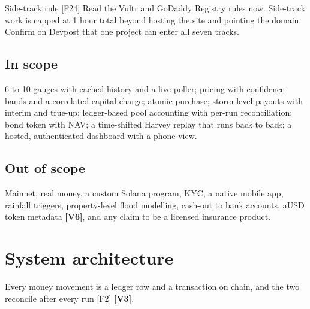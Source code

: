 \documentclass[11pt]{article}
\newcommand{\fix}[1]{\textcolor{fixgreen}{\textbf{[#1]}}}
\begin{document}
\begin{callout}[atlasorange]{Side-track rule [F24]}
Read the Vultr and GoDaddy Registry rules now. Side-track work is capped at 1 hour total beyond hosting the site and pointing the domain. Confirm on Devpost that one project can enter all seven tracks.
\end{callout}

\subsection{In scope}
6 to 10 gauges with cached history and a live poller; pricing with confidence bands and a correlated capital charge; atomic purchase; storm-level payouts with interim and true-up; ledger-based pool accounting with per-run reconciliation; bond token with NAV; a time-shifted Harvey replay that runs back to back; a hosted, authenticated dashboard with a phone view.

\subsection{Out of scope}
Mainnet, real money, a custom Solana program, KYC, a native mobile app, rainfall triggers, property-level flood modelling, cash-out to bank accounts, aUSD token metadata \fix{V6}, and any claim to be a licensed insurance product.

\section{System architecture}

Every money movement is a ledger row and a transaction on chain, and the two reconcile after every run [F2] \fix{V3}.
\end{document}
